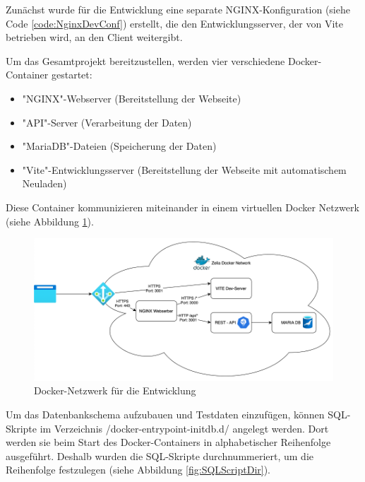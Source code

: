  \label{sec:dockerDevImpl}

Zunächst wurde für die Entwicklung eine separate NGINX-Konfiguration (siehe Code \ref{code:NginxDevConf}) erstellt, die den Entwicklungsserver, der von Vite betrieben wird, an den Client weitergibt.


Um das Gesamtprojekt bereitzustellen, werden vier verschiedene Docker-Container gestartet:

\begin{itemize}
    \item "NGINX"-Webserver (Bereitstellung der Webseite)
    \item "API"-Server (Verarbeitung der Daten)
    \item "MariaDB"-Dateien (Speicherung der Daten)
    \item "Vite"-Entwicklungsserver (Bereitstellung der Webseite mit automatischem Neuladen)
\end{itemize}

Diese Container kommunizieren miteinander in einem virtuellen Docker Netzwerk (siehe Abbildung \ref{fig:DockerDevNetwork}). 

\begin{figure}[H]
    \centering
    \includegraphics{media/Docker/DevNetwork.png}
    \caption{Docker-Netzwerk für die Entwicklung}
    \label{fig:DockerDevNetwork}
\end{figure}

Um das Datenbankschema aufzubauen und Testdaten einzufügen, können SQL-Skripte im Verzeichnis {\ttfamily /docker-entrypoint-initdb.d/} angelegt werden. Dort werden sie beim Start des Docker-Containers in alphabetischer Reihenfolge ausgeführt. Deshalb wurden die SQL-Skripte durchnummeriert, um die Reihenfolge festzulegen (siehe Abbildung \ref{fig:SQLScriptDir}).

